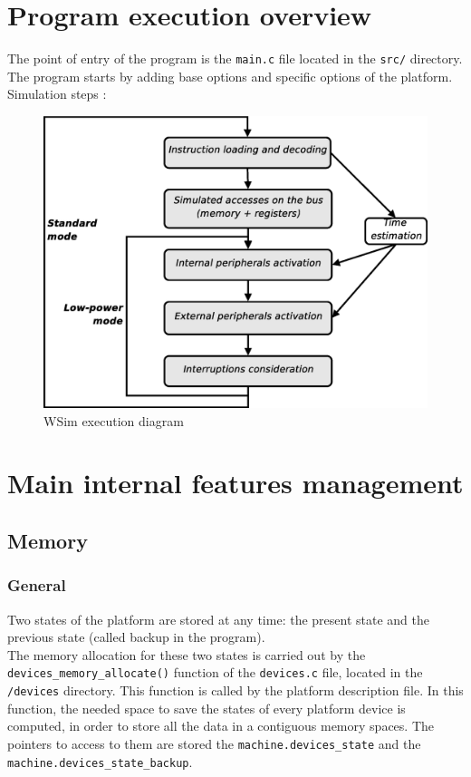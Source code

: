 \documentclass[a4paper,10pt]{report}
\begin{document}
\chapter{Program execution overview}

The point of entry of the program is the \verb$main.c$ file located in the \verb$src/$ directory. The program starts by adding base options and specific options of the platform.
Simulation steps :

\begin{figure}[ht]
\begin{center}
 \includegraphics[scale=0.4]{figures/wsim_diag.eps}
\end{center}
\caption{WSim execution diagram}
\label{wsim diagram}
\end{figure}


\chapter{Main internal features management}

\section{Memory}
\subsection{General}
Two states of the platform are stored at any time: the present state and the previous state (called backup in the program).\\

The memory allocation for these two states is carried out by the \verb$devices_memory_allocate()$ function of the \verb$devices.c$ file, located in the \verb$/devices$ directory. This function is called by the platform description file.
In this function, the needed space to save the states of every platform device is computed, in order to store all the data in a contiguous memory spaces.  The pointers to access to them are stored the \verb$machine.devices_state$ and the \verb$machine.devices_state_backup$.\\
\end{document}
